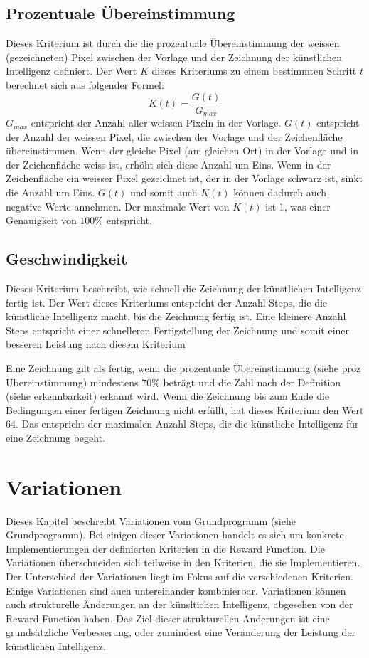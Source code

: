 \subsection{Prozentuale Übereinstimmung}
Dieses Kriterium ist durch die die prozentuale Übereinstimmung der weissen
(gezeichneten) Pixel zwischen der Vorlage und der Zeichnung der künstlichen
Intelligenz definiert. Der Wert $K$ dieses Kriteriums zu einem bestimmten
Schritt $t$ berechnet sich aus folgender Formel:
\begin{equation}
  \label{eq:m_reward}
  K(t) = \frac{G(t)}{G_{max}}
\end{equation}
$G_{max}$ entspricht der Anzahl aller weissen Pixeln in der Vorlage. $G(t)$
entspricht der Anzahl der weissen Pixel, die zwischen der Vorlage und der
Zeichenfläche übereinstimmen. Wenn der gleiche Pixel (am gleichen Ort) in der
Vorlage und in der Zeichenfläche weiss ist, erhöht sich diese Anzahl um Eins.
Wenn in der Zeichenfläche ein weisser Pixel gezeichnet ist, der in der Vorlage
schwarz ist, sinkt die Anzahl um Eins. $G(t)$ und somit auch $K(t)$ können
dadurch auch negative Werte annehmen. Der maximale Wert von $K(t)$ ist 1, was
einer Genauigkeit von $100\%$ entspricht.

\subsection{Geschwindigkeit}
Dieses Kriterium beschreibt, wie schnell die Zeichnung der künstlichen
Intelligenz fertig ist. Der Wert dieses Kriteriums entspricht der Anzahl Steps,
die die künstliche Intelligenz macht, bis die Zeichnung fertig ist. Eine
kleinere Anzahl Steps entspricht einer schnelleren Fertigstellung der Zeichnung
und somit einer besseren Leistung nach diesem Kriterium

Eine Zeichnung gilt als fertig, wenn die prozentuale Übereinstimmung (siehe proz
Übereinstimmung) mindestens 70\% beträgt und die Zahl nach der Definition (siehe
erkennbarkeit) erkannt wird. Wenn die Zeichnung bis zum Ende die Bedingungen
einer fertigen Zeichnung nicht erfüllt, hat dieses Kriterium den Wert $64$. Das
entspricht der maximalen Anzahl Steps, die die künstliche Intelligenz für eine
Zeichnung begeht.


\section{Variationen}
Dieses Kapitel beschreibt Variationen vom Grundprogramm (siehe Grundprogramm).
Bei einigen dieser Variationen handelt es sich um konkrete Implementierungen der
definierten Kriterien in die Reward Function. Die Variationen überschneiden sich
teilweise in den Kriterien, die sie Implementieren. Der Unterschied der
Variationen liegt im Fokus auf die verschiedenen Kriterien. Einige Variationen
sind auch untereinander kombinierbar. Variationen können auch strukturelle
Änderungen an der künsltichen Intelligenz, abgesehen von der Reward Function
haben. Das Ziel dieser strukturellen Änderungen ist eine grundsätzliche
Verbesserung, oder zumindest eine Veränderung der Leistung der künstlichen
Intelligenz. 


